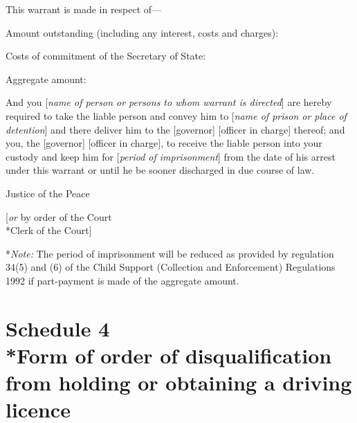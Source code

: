\documentclass[12pt,a4paper]{article}
\begin{document}
\medskip

This warrant is made in respect of---

Amount outstanding (including any interest, 
costs and charges):

Costs of commitment of the Secretary of State:

\medskip

Aggregate amount:

\medskip

And you [\emph{name of person or persons to whom warrant is directed}] are hereby required to take the liable person and convey him to [\emph{name of prison or place of detention}] and there deliver him to the [governor] [officer in charge] thereof; and you, the [governor] [officer in charge], to receive the liable person into your custody and keep him for [\emph{period of imprisonment}] from the date of his arrest under this warrant or until he be sooner discharged in due course of law.

\medskip

{\raggedleft Justice of the Peace

\medskip

[\emph{or} by order of the Court\\*Clerk of the Court]

}

\medskip

*\emph{Note:} The period of imprisonment will be reduced as provided by regulation 34(5) and (6) of the Child Support (Collection and Enforcement) Regulations 1992 if part-payment is made of the aggregate amount.


\part[Schedule 4 --- Form of order of disqualification from holding or obtaining a driving licence]{Schedule 4\\*Form of order of disqualification from holding or obtaining a driving licence}

\renewcommand\parthead{--- Schedule 4}

\end{document}
